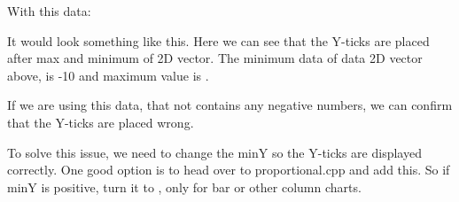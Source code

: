 With this data\+:


\begin{DoxyCode}{0}
\DoxyCodeLine{\textcolor{comment}{//\ Create\ data\ for\ bar}}
\DoxyCodeLine{}

\end{DoxyCode}


It would look something like this. Here we can see that the Y-\/ticks are placed after max and minimum of {\ttfamily 2D} vector. The minimum data of {\ttfamily data} 2D vector above, is {\ttfamily -\/10} and maximum value is {}.



If we are using this data, that not contains any negative numbers, we can confirm that the Y-\/ticks are placed wrong.


\begin{DoxyCode}{0}
\DoxyCodeLine{\textcolor{comment}{//\ Create\ data\ for\ bar}}
\DoxyCodeLine{}

\end{DoxyCode}




To solve this issue, we need to change the {\ttfamily minY} so the {\ttfamily Y}-\/ticks are displayed correctly. One good option is to head over to {\ttfamily proportional.\+cpp} and add this. So if {\ttfamily minY} is positive, turn it to {}, only for {\ttfamily bar} or other column charts.


